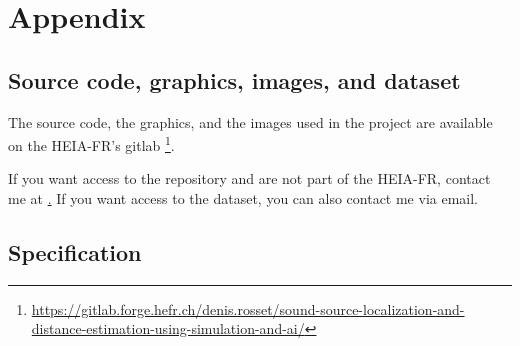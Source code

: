 \chapter{Appendix}
\newpage

\section{Source code, graphics, images, and dataset}
\label{appendix:source_code}

The source code, the graphics, and the images used in the project are available on the HEIA-FR's gitlab \footnote{\url{https://gitlab.forge.hefr.ch/denis.rosset/sound-source-localization-and-distance-estimation-using-simulation-and-ai/}}.

If you want access to the repository and are not part of the HEIA-FR, contact me at \href{mailto:denis.rosset@hefr.ch}.
If you want access to the dataset, you can also contact me via email.

\section{Specification}
\label{appendix:specification}

